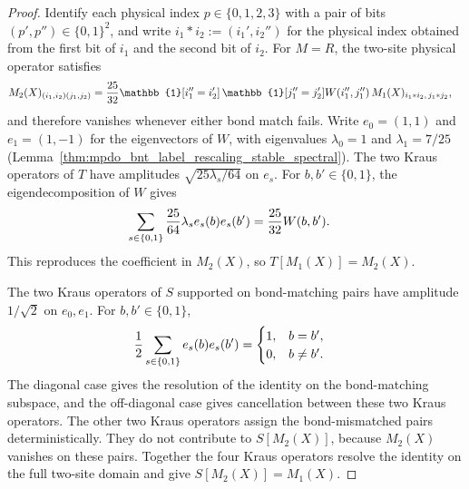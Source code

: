 \begin{proof}\leanok
    Identify each physical index $p\in\{0,1,2,3\}$ with a pair of bits
    $(p',p'')\in\{0,1\}^2$, and write $i_1\ast i_2:=(i_1',i_2'')$
    for the physical index obtained from the first bit of $i_1$ and the second
    bit of $i_2$. For $M=R$, the two-site physical operator satisfies
    \begin{align}
        M_2(X)_{(i_1,i_2)(j_1,j_2)}
         & =\frac{25}{32}
        \mathbb{1}[i_1''=i_2']\,\mathbb{1}[j_1''=j_2']
        W(i_1'',j_1'')\,M_1(X)_{i_1\ast i_2,\,j_1\ast j_2},
        \notag
    \end{align}
    and therefore vanishes whenever either bond match fails.
    Write $e_0=(1,1)$ and $e_1=(1,-1)$ for the eigenvectors of $W$,
    with eigenvalues $\lambda_0=1$ and $\lambda_1=7/25$
    (Lemma~\ref{thm:mpdo_bnt_label_rescaling_stable_spectral}).
    The two Kraus operators of $T$ have amplitudes
    $\sqrt{25\lambda_s/64}$ on $e_s$. For $b,b'\in\{0,1\}$,
    the eigendecomposition of $W$ gives
    \begin{align}
        \sum_{s\in\{0,1\}}\frac{25}{64}\lambda_s e_s(b)e_s(b')
         & =\frac{25}{32}W(b,b').
        \notag
    \end{align}
    This reproduces the coefficient in $M_2(X)$, so $T[M_1(X)]=M_2(X)$.

    The two Kraus operators of $S$ supported on bond-matching pairs have
    amplitude $1/\sqrt2$ on $e_0,e_1$. For $b,b'\in\{0,1\}$,
    \begin{align}
        \frac12\sum_{s\in\{0,1\}}e_s(b)e_s(b')
         & =\begin{cases}1,&b=b',\\0,&b\ne b'.\end{cases}
        \notag
    \end{align}
    The diagonal case gives the resolution of the identity on the
    bond-matching subspace, and the off-diagonal case gives cancellation
    between these two Kraus operators. The other two Kraus operators
    assign the bond-mismatched pairs deterministically.
    They do not contribute to $S[M_2(X)]$, because $M_2(X)$ vanishes
    on these pairs. Together the four Kraus operators resolve the identity
    on the full two-site domain and give $S[M_2(X)]=M_1(X)$.
\end{proof}

